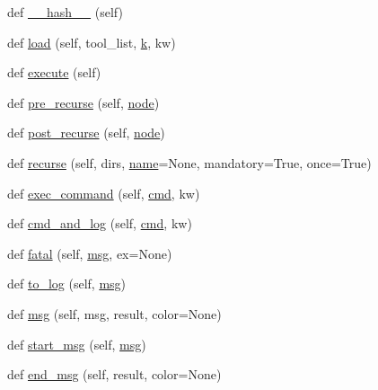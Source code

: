 \begin{DoxyCompactItemize}
\item 
def \hyperlink{classwaflib_1_1_context_1_1_context_ae8096e428213ed965d8cd5629c2481a1}{\+\_\+\+\_\+hash\+\_\+\+\_\+} (self)
\item 
def \hyperlink{classwaflib_1_1_context_1_1_context_ad214db6a7b3ce05051972f7d073a74f2}{load} (self, tool\+\_\+list, \hyperlink{rfft2d_test_m_l_8m_adc468c70fb574ebd07287b38d0d0676d}{k}, kw)
\item 
def \hyperlink{classwaflib_1_1_context_1_1_context_ae98aa77cb954743799c5b730c6775329}{execute} (self)
\item 
def \hyperlink{classwaflib_1_1_context_1_1_context_a290c81ad18ad9b3c0bcbde2d8fce519e}{pre\+\_\+recurse} (self, \hyperlink{structnode}{node})
\item 
def \hyperlink{classwaflib_1_1_context_1_1_context_ab818cd610ecc0c6fa981f0cde9f3dd13}{post\+\_\+recurse} (self, \hyperlink{structnode}{node})
\item 
def \hyperlink{classwaflib_1_1_context_1_1_context_a10e3b0d5e63bb03a0a7adbb32c3dceab}{recurse} (self, dirs, \hyperlink{lib_2expat_8h_a1b49b495b59f9e73205b69ad1a2965b0}{name}=None, mandatory=True, once=True)
\item 
def \hyperlink{classwaflib_1_1_context_1_1_context_aaa7d209a0d05f2f8e45fc11b83c72dba}{exec\+\_\+command} (self, \hyperlink{sndfile__play_8m_adfc5ba7e22f5e4a6221c12a70503bef3}{cmd}, kw)
\item 
def \hyperlink{classwaflib_1_1_context_1_1_context_aaa63c5a7ac60f1bf164febe6642d270f}{cmd\+\_\+and\+\_\+log} (self, \hyperlink{sndfile__play_8m_adfc5ba7e22f5e4a6221c12a70503bef3}{cmd}, kw)
\item 
def \hyperlink{classwaflib_1_1_context_1_1_context_a42739307965d7ef470985d7bb7408788}{fatal} (self, \hyperlink{classwaflib_1_1_context_1_1_context_a7495a2e04e528aa54bda3cadf08240cb}{msg}, ex=None)
\item 
def \hyperlink{classwaflib_1_1_context_1_1_context_a596fa2d8dc5a61602101f43ec1eb3e7e}{to\+\_\+log} (self, \hyperlink{classwaflib_1_1_context_1_1_context_a7495a2e04e528aa54bda3cadf08240cb}{msg})
\item 
def \hyperlink{classwaflib_1_1_context_1_1_context_a7495a2e04e528aa54bda3cadf08240cb}{msg} (self, msg, result, color=None)
\item 
def \hyperlink{classwaflib_1_1_context_1_1_context_a344a0dff2c7b0d2d76057d55b83c3f16}{start\+\_\+msg} (self, \hyperlink{classwaflib_1_1_context_1_1_context_a7495a2e04e528aa54bda3cadf08240cb}{msg})
\item 
def \hyperlink{classwaflib_1_1_context_1_1_context_a6340799a7fa4dc1230d13b7c08eec789}{end\+\_\+msg} (self, result, color=None)

\end{DoxyCompactItemize}
